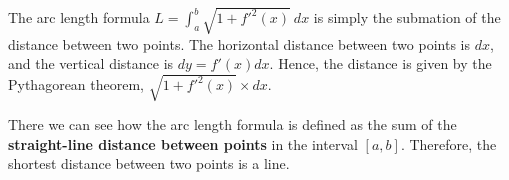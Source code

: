 \documentclass{article}
\begin{document}
The arc length formula $L=\int_{a}^{b}\sqrt{1+f'^2(x)}\:dx$ is simply the submation of the distance between two points. The horizontal distance between two points is $dx$, and the vertical distance is $dy=f'(x)dx$.
Hence, the distance is given by the Pythagorean theorem, $\sqrt{1+f'^2(x)}\times dx$.

There we can see how the arc length formula is defined as the sum of the \textbf{straight-line distance between points} in the interval $[a,b]$. Therefore, the shortest distance between two points is a line.
\end{document}
